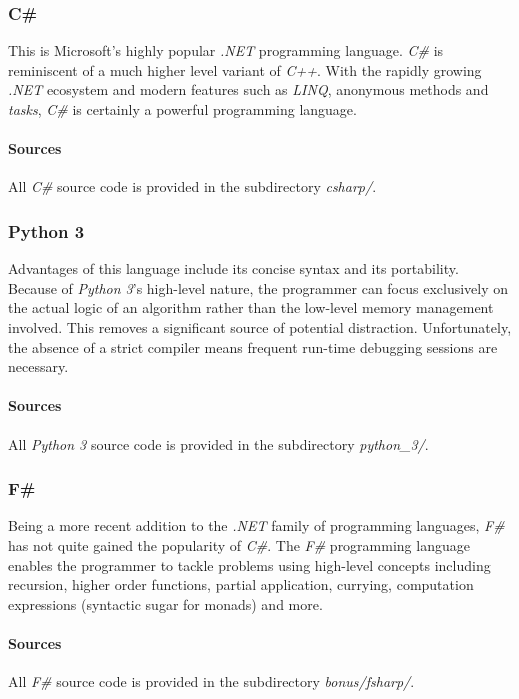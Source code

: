 \documentclass{article}
\begin{document}
\subsubsection{C\#}
This is Microsoft's highly popular {\em .NET} programming language. {\em C\#} is reminiscent of a much higher level
variant of {\em C++}. With the rapidly growing {\em .NET} ecosystem and modern features such as {\em LINQ},
anonymous methods and {\em tasks}, {\em C\#} is certainly a powerful programming language.

\paragraph{Sources}
All {\em C\#} source code is provided in the subdirectory {\em csharp/}.

\subsubsection{Python 3}
Advantages of this language include its concise syntax and its portability. Because of {\em Python 3}'s high-level
nature, the programmer can focus exclusively on the actual logic of an algorithm rather than the low-level memory
management involved. This removes a significant source of potential distraction. Unfortunately, the absence of a
strict compiler means frequent run-time debugging sessions are necessary.

\paragraph{Sources}
All {\em Python 3} source code is provided in the subdirectory {\em python\_3/}.

\subsubsection{F\#}
Being a more recent addition to the {\em .NET} family of programming languages, {\em F\#} has not quite gained the
popularity of {\em C\#}. The {\em F\#} programming language enables the programmer to tackle problems using
high-level concepts including recursion, higher order functions, partial application, currying, computation
expressions (syntactic sugar for monads) and more.

\paragraph{Sources}
All {\em F\#} source code is provided in the subdirectory {\em bonus/fsharp/}.
\end{document}
